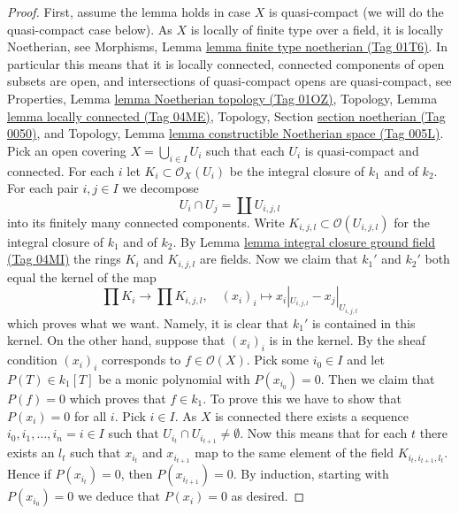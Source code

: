 \documentclass{amsart}
\theoremstyle{plain}
\theoremstyle{definition}
\theoremstyle{remark}
\numberwithin{equation}{subsection}
\begin{document}
\begin{proof}
First, assume the lemma holds in case $X$ is quasi-compact (we will
do the quasi-compact case below).
As $X$ is locally of finite type over a field, it is locally Noetherian, see
Morphisms, Lemma \href{https://stacks.math.columbia.edu/tag/01T6}{lemma finite type noetherian (Tag 01T6)}.
In particular this means that it is locally connected,
connected components of open subsets are open, and
intersections of quasi-compact opens are quasi-compact, see
Properties, Lemma \href{https://stacks.math.columbia.edu/tag/01OZ}{lemma Noetherian topology (Tag 01OZ)},
Topology, Lemma \href{https://stacks.math.columbia.edu/tag/04ME}{lemma locally connected (Tag 04ME)},
Topology, Section \href{https://stacks.math.columbia.edu/tag/0050}{section noetherian (Tag 0050)}, and
Topology, Lemma \href{https://stacks.math.columbia.edu/tag/005L}{lemma constructible Noetherian space (Tag 005L)}.
Pick an open covering $X = \bigcup_{i \in I} U_i$
such that each $U_i$ is quasi-compact and connected.
For each $i$ let $K_i \subset \mathcal{O}_X(U_i)$ be the integral
closure of $k_1$ and of $k_2$.
For each pair $i, j \in I$ we decompose
$$
U_i \cap U_j = \coprod U_{i, j, l}
$$
into its finitely many connected components. Write
$K_{i, j, l} \subset \mathcal{O}(U_{i, j, l})$
for the integral closure of $k_1$ and of $k_2$. By
Lemma \href{https://stacks.math.columbia.edu/tag/04MI}{lemma integral closure ground field (Tag 04MI)}
the rings $K_i$ and $K_{i, j, l}$ are fields.
Now we claim that $k_1'$ and $k_2'$ both equal the kernel of the map
$$
\prod K_i \longrightarrow \prod K_{i, j, l}, \quad
(x_i)_i \longmapsto x_i|_{U_{i, j, l}} - x_j|_{U_{i, j, l}}
$$
which proves what we want.
Namely, it is clear that $k_1'$ is contained in this kernel.
On the other hand, suppose that $(x_i)_i$ is in the kernel.
By the sheaf condition $(x_i)_i$ corresponds to $f \in \mathcal{O}(X)$.
Pick some $i_0 \in I$ and let $P(T) \in k_1[T]$ be a monic polynomial
with $P(x_{i_0}) = 0$. Then we claim that $P(f) = 0$ which proves
that $f \in k_1$. To prove this we have to show that $P(x_i) = 0$
for all $i$. Pick $i \in I$. As $X$ is connected there exists a
sequence $i_0, i_1, \ldots, i_n = i \in I$ such that
$U_{i_t} \cap U_{i_{t + 1}} \not = \emptyset$. Now this means that
for each $t$ there exists an $l_t$ such that $x_{i_t}$ and
$x_{i_{t + 1}}$ map to the same element of the field $K_{i_t, i_{t + 1}, l_t}$.
Hence if $P(x_{i_t}) = 0$, then $P(x_{i_{t + 1}}) = 0$. By
induction, starting with $P(x_{i_0}) = 0$ we deduce that
$P(x_i) = 0$ as desired.


\end{proof}
\end{document}
